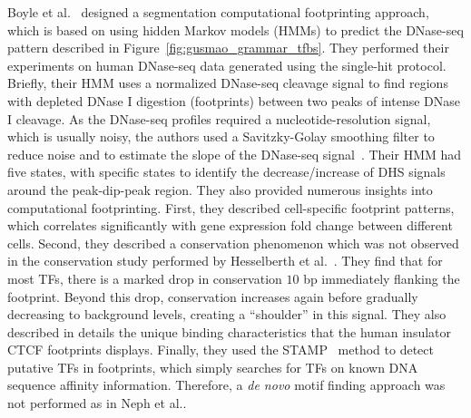Boyle et al.~\cite{boyle2011} designed a segmentation computational footprinting approach, which is based on using hidden Markov models (HMMs) to predict the DNase-seq pattern described in Figure~\ref{fig:gusmao_grammar_tfbs}. They performed their experiments on human DNase-seq data generated using the single-hit protocol. Briefly, their HMM uses a normalized DNase-seq cleavage signal to find regions with depleted DNase I digestion (footprints) between two peaks of intense DNase I cleavage. As the DNase-seq profiles required a nucleotide-resolution signal, which is usually noisy, the authors used a Savitzky-Golay smoothing filter to reduce noise and to estimate the slope of the DNase-seq signal~\cite{madden1978}. Their HMM had five states, with specific states to identify the decrease/increase of DHS signals around the peak-dip-peak region. They also provided numerous insights into computational footprinting. First, they described cell-specific footprint patterns, which correlates significantly with gene expression fold change between different cells. Second, they described a conservation phenomenon which was not observed in the conservation study performed by Hesselberth et al.~\cite{hesselberth2009}. They find that for most TFs, there is a marked drop in conservation \approxy$10$ bp immediately flanking the footprint. Beyond this drop, conservation increases again before gradually decreasing to background levels, creating a ``shoulder'' in this signal. They also described in details the unique binding characteristics that the human insulator CTCF footprints displays. Finally, they used the STAMP~\cite{mahony2007} method to detect putative TFs in footprints, which simply searches for TFs on known DNA sequence affinity information. Therefore, a \emph{de novo} motif finding approach was not performed as in Neph et al.\cite{neph2012a}.

